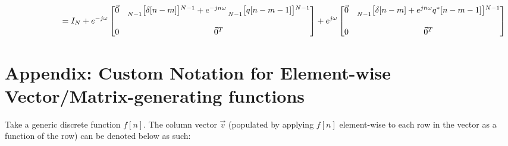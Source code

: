 \documentclass{article}
\begin{document}
\begin{align*}
    &\quad \quad \quad \quad \quad \quad \ = I_{N} + e^{-j\omega}\begin{bmatrix}
                                                                    \vec{0} & \prescript{}{N - 1}{\begin{bmatrix} \delta[n - m] \end{bmatrix}}^{N - 1} + e^{-jn\omega}\prescript{}{N - 1}{\begin{bmatrix} q[n - m - 1] \end{bmatrix}}^{N - 1}\\ \\
                                                                         0  & \vec{0}^{T}
                                                                   \end{bmatrix}
                                                   + e^{j\omega}\begin{bmatrix}
                                                                    \vec{0} & \prescript{}{N - 1}{\begin{bmatrix} \delta[n - m] + e^{jn\omega}q^{*}[n - m - 1] \end{bmatrix}}^{N - 1} \\ \\
                                                                         0  & \vec{0}^{T}
                                                                  \end{bmatrix}
  \end{align*}

\newpage
\section {Appendix: Custom Notation for Element-wise Vector/Matrix-generating functions}

Take a generic discrete function $f[n]$. The column vector $\vec{v}$ (populated by applying $f[n]$ element-wise to each row in the vector as a function of the row) can be denoted below as such:
\end{document}
